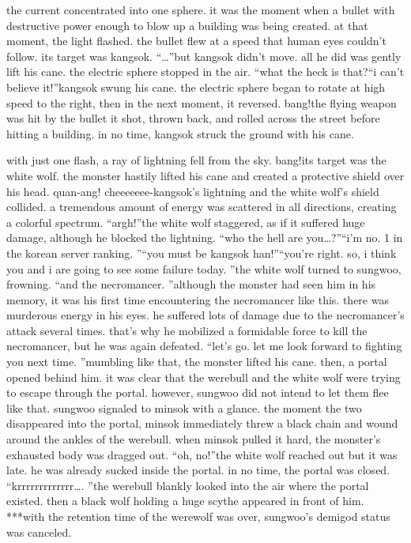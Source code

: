  the current concentrated into one sphere.
 it was the moment when a bullet with destructive power enough to blow up a building was being created.
at that moment, the light flashed.
 the bullet flew at a speed that human eyes couldn’t follow.
 its target was kangsok.
“…”but kangsok didn’t move.
 all he did was gently lift his cane.
the electric sphere stopped in the air.
“what the heck is that?“i can’t believe it!”kangsok swung his cane.
 the electric sphere began to rotate at high speed to the right, then in the next moment, it reversed.
bang!the flying weapon was hit by the bullet it shot, thrown back, and rolled across the street before hitting a building.
in no time, kangsok struck the ground with his cane.

with just one flash, a ray of lightning fell from the sky.
bang!its target was the white wolf.
 the monster hastily lifted his cane and created a protective shield over his head.
quan-ang! cheeeeeee-kangsok’s lightning and the white wolf’s shield collided.
 a tremendous amount of energy was scattered in all directions, creating a colorful spectrum.
“argh!”the white wolf staggered, as if it suffered huge damage, although he blocked the lightning.
“who the hell are you…?”“i’m no.
 1 in the korean server ranking.
”“you must be kangsok han!”“you’re right.
 so, i think you and i are going to see some failure today.
”the white wolf turned to sungwoo, frowning.
“and the necromancer.
”although the monster had seen him in his memory, it was his first time encountering the necromancer like this.
there was murderous energy in his eyes.
 he suffered lots of damage due to the necromancer’s attack several times.
 that’s why he mobilized a formidable force to kill the necromancer, but he was again defeated.
“let’s go.
 let me look forward to fighting you next time.
”mumbling like that, the monster lifted his cane.
 then, a portal opened behind him.
it was clear that the werebull and the white wolf were trying to escape through the portal.
however, sungwoo did not intend to let them flee like that.
sungwoo signaled to minsok with a glance.
the moment the two disappeared into the portal, minsok immediately threw a black chain and wound around the ankles of the werebull.
 when minsok pulled it hard, the monster’s exhausted body was dragged out.
“oh, no!”the white wolf reached out but it was late.
 he was already sucked inside the portal.
 in no time, the portal was closed.
“krrrrrrrrrrrrr….
”the werebull blankly looked into the air where the portal existed.
then a black wolf holding a huge scythe appeared in front of him.
***with the retention time of the werewolf was over, sungwoo’s demigod status was canceled.

